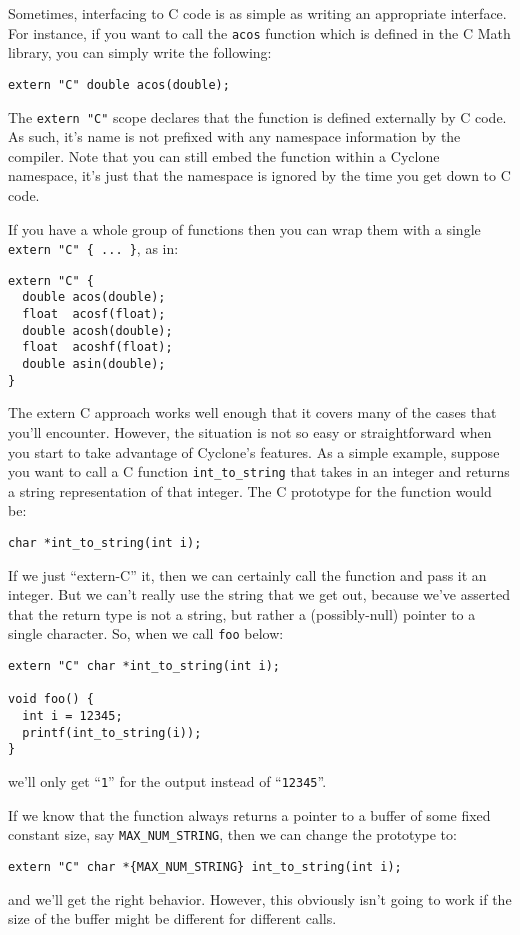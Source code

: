 Sometimes, interfacing to C code is as simple as writing
an appropriate interface.  For instance, if you want to
call the \texttt{acos} function which is defined in the C
Math library, you can simply write the following:
\begin{verbatim}
extern "C" double acos(double);
\end{verbatim}
The \texttt{extern "C"} scope declares that the function is
defined externally by C code.  As such, it's name is not
prefixed with any namespace information by the compiler.
Note that you can still embed the function within a Cyclone
namespace, it's just that the namespace is ignored by the
time you get down to C code.  

If you have a whole group of functions then you can wrap them with
a single \texttt{extern "C" \{ ... \}}, as in:
\begin{verbatim}
extern "C" {
  double acos(double);
  float  acosf(float);
  double acosh(double);
  float  acoshf(float);
  double asin(double);
}
\end{verbatim}

The extern C approach works well enough that it covers many
of the cases that you'll encounter.  However, the situation is
not so easy or straightforward when you start to take advantage
of Cyclone's features.  As a simple example, suppose you want
to call a C function \texttt{int\_to\_string} that takes in
an integer and returns a string representation of that integer.
The C prototype for the function would be:
\begin{verbatim}
char *int_to_string(int i);
\end{verbatim}
If we just ``extern-C'' it, then we can certainly call the function
and pass it an integer.  But we can't really use the string
that we get out, because we've asserted that the return type
is not a string, but rather a (possibly-null) pointer to a single
character.  So, when we call \texttt{foo} below:
\begin{verbatim}
extern "C" char *int_to_string(int i);

void foo() {
  int i = 12345;
  printf(int_to_string(i));
}
\end{verbatim}
we'll only get ``\texttt{1}'' for the output instead of
``\texttt{12345}''.  

If we know that the function always returns a pointer to a buffer of 
some fixed constant size, say \texttt{MAX\_NUM\_STRING}, then
we can change the prototype to:
\begin{verbatim}
extern "C" char *{MAX_NUM_STRING} int_to_string(int i);
\end{verbatim}
and we'll get the right behavior.  However, this obviously isn't
going to work if the size of the buffer might be different for
different calls.  

